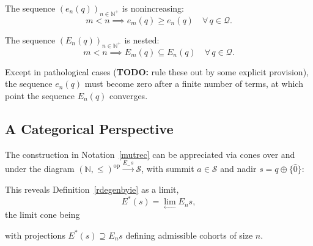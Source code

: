 \documentclass{article}
\newcommand{\N}{\mathbb{N}}
\renewcommand{\S}{\ensuremath{\mathcal{S}}} %
\newcommand{\Q}{\ensuremath{\mathcal{Q}}}
\DeclareMathOperator{\dual}{op}
\begin{document}
\begin{fact}
  The sequence $(e_n(q))_{n \in \N^+}$ is nonincreasing:
  $$
  m < n \implies e_m(q) \ge e_n(q) \quad \forall\, q \in \Q.
  $$
\end{fact}

\begin{fact}
  The sequence $(E_n(q))_{n \in \N^+}$ is nested:
  $$
  m < n \implies E_m(q) \subseteq E_n(q) \quad \forall\, q \in \Q.
  $$
\end{fact}

Except in pathological cases (\textbf{TODO:} rule these out by some explicit provision), the sequence $e_n(q)$ must become zero after a finite number of terms, at which point the sequence $E_n(q)$ converges.

\subsection{A Categorical Perspective}

The construction in Notation~\ref{mutrec} can be appreciated via cones over and under the diagram $(\N,\le)^{\dual} \xrightarrow{E_{-} s} \S$, with summit $a \in \S$ and nadir $s = q\oplus\{\widehat{0}\}$:
\begin{center}
\end{center}
This reveals Definition~\ref{rdegenbyie} as a limit,
$$
E^*(s) = \lim_{\longleftarrow} E_ns,
$$
the limit cone being
\begin{center}
\end{center}
with projections $E^*(s) \supseteq E_ns$ defining admissible cohorts of size $n$.
\end{document}
